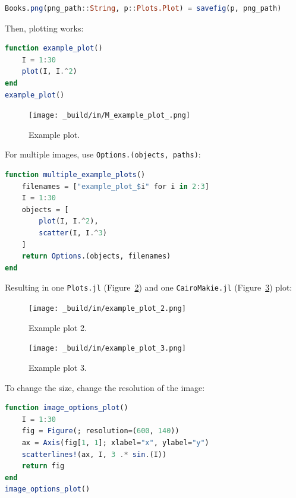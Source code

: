 \documentclass[
  notoc %
]{tufte-book}
\newcommand{\passthrough}[1]{#1}
\begin{document}
\begin{lstlisting}[language=Julia]
Books.png(png_path::String, p::Plots.Plot) = savefig(p, png_path)
\end{lstlisting}

Then, plotting works:

\begin{lstlisting}[language=Julia]
function example_plot()
    I = 1:30
    plot(I, I.^2)
end
example_plot()
\end{lstlisting}

\begin{figure}
\hypertarget{fig:example_plot}{%
\centering
\texttt{[image: \_build/im/M\_example\_plot\_.png]}
\caption{Example plot.}\label{fig:example_plot}
}
\end{figure}

For multiple images, use
\passthrough{\lstinline!Options.(objects, paths)!}:

\begin{lstlisting}[language=Julia]
function multiple_example_plots()
    filenames = ["example_plot_$i" for i in 2:3]
    I = 1:30
    objects = [
        plot(I, I.^2),
        scatter(I, I.^3)
    ]
    return Options.(objects, filenames)
end
\end{lstlisting}

Resulting in one \passthrough{\lstinline!Plots.jl!}
(Figure~\ref{fig:example_plot_2}) and one
\passthrough{\lstinline!CairoMakie.jl!}
(Figure~\ref{fig:example_plot_3}) plot:

\begin{figure}
\hypertarget{fig:example_plot_2}{%
\centering
\texttt{[image: \_build/im/example\_plot\_2.png]}
\caption{Example plot 2.}\label{fig:example_plot_2}
}
\end{figure}

\begin{figure}
\hypertarget{fig:example_plot_3}{%
\centering
\texttt{[image: \_build/im/example\_plot\_3.png]}
\caption{Example plot 3.}\label{fig:example_plot_3}
}
\end{figure}

To change the size, change the resolution of the image:

\begin{lstlisting}[language=Julia]
function image_options_plot()
    I = 1:30
    fig = Figure(; resolution=(600, 140))
    ax = Axis(fig[1, 1]; xlabel="x", ylabel="y")
    scatterlines!(ax, I, 3 .* sin.(I))
    return fig
end
image_options_plot()
\end{lstlisting}
\end{document}
